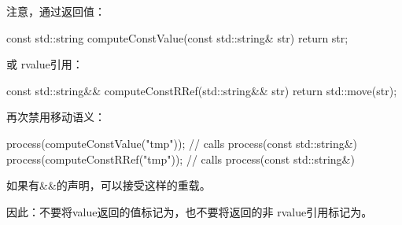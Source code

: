 注意，通过返回值：

\begin{cppcode}
const std::string computeConstValue(const std::string& str) {
	return str;
}
\end{cppcode}

或 rvalue引用：

\begin{cppcode}
const std::string&& computeConstRRef(std::string&& str) {
	return std::move(str);
}
\end{cppcode}

再次禁用移动语义：

\begin{cppcode}
process(computeConstValue("tmp")); // calls process(const std::string&)
process(computeConstRRef("tmp")); // calls process(const std::string&)
\end{cppcode}

如果有\&\&的声明，可以接受这样的重载。

因此：不要将value返回的值标记为，也不要将返回的非 rvalue引用标记为。


